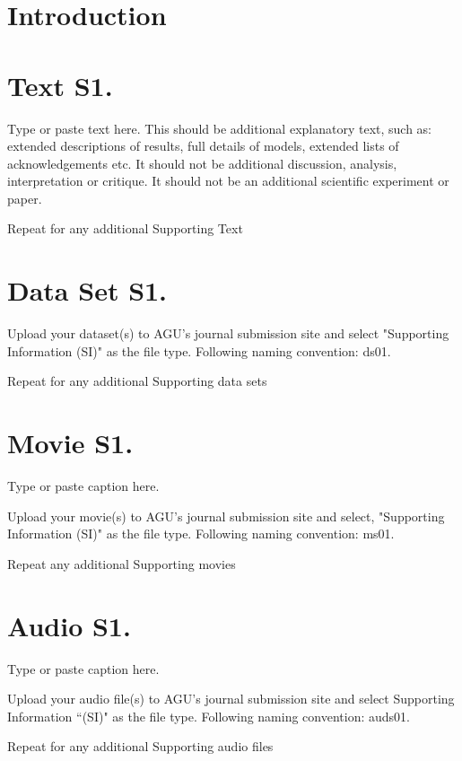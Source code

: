 \documentclass[draft]{agujournal}
\begin{document}
\section*{Introduction}


\section*{Text S1.}

Type or paste text here. This should be additional explanatory text,
such as: extended descriptions of results, full details of models,
extended lists of acknowledgements etc.  It should not be
additional discussion, analysis, interpretation or critique. It
should not be an additional scientific experiment or paper.

Repeat for any additional Supporting Text


\section*{Data Set S1.} %

Upload your dataset(s) to AGU's journal submission site and select
"Supporting Information (SI)" as the file type. Following naming
convention: ds01.

Repeat for any additional Supporting data sets

\section*{Movie S1.} 

Type or paste caption here.

Upload your movie(s) to AGU's journal submission site and select,
"Supporting Information (SI)" as the file type. Following naming convention: ms01.

Repeat any additional Supporting movies

\section*{Audio S1.} 

Type or paste caption here.

Upload your audio file(s) to AGU's journal submission site and select
Supporting Information ``(SI)" as the file type. Following naming
convention: auds01.

Repeat for any additional Supporting audio files
\end{document}
